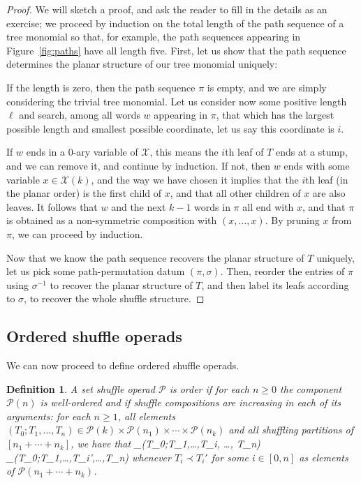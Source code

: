 \documentclass[fleqn, a4paper, twoside]{article}
\makeatletter
\newcommand{\0}{\langle 0\rangle}
\newcommand{\XX}{\mathcal{X}}
\let\[\@undefined
\DeclareRobustCommand{\[}{\begin{equation}}%
\let\]\@undefined
\DeclareRobustCommand{\]}{\end{equation}}%
\theoremstyle{mytheorem}
\theoremstyle{introthm}
\theoremstyle{mydefinition}
\newtheorem{definition}[theorem]{Definition}
\theoremstyle{mydefinition2}
\theoremstyle{plain} %
\newcommand{\?}{\,?\,}
\newcommand{\PP}{{\mathcal{P}}}
\theoremstyle{mytheorem}
\theoremstyle{plain} %
\makeatother
\begin{document}
\begin{proof}
We will sketch a proof, and ask the reader to fill in the
details as an exercise; we proceed by induction on the
total length of the path sequence of a tree monomial so that,
for example, the path sequences appearing in Figure~\ref{fig:paths}
have all length five. First, let us show that the path sequence
determines the planar structure of our tree monomial uniquely:

If the length is zero, then the path sequence $\pi$
is empty, and we are simply considering the trivial tree monomial.
Let us consider now some positive length $\ell$ and search,
among all words $w$ appearing in $\pi$, that which has
the largest possible length and smallest possible coordinate,
let us say this coordinate is $i$.

If $w$ ends in a $0$-ary variable of $\XX$, this means the
$i$th leaf of $T$ ends at a stump, and we can remove it, 
and continue by induction. If not, then $w$ ends with
some variable $x\in \XX(k)$, and the way we have chosen
it implies that the $i$th leaf (in the planar order)
is the first child of $x$, and that all other children
of $x$ are also leaves. It follows that $w$
and the next $k-1$ words in $\pi$ all end with $x$,
and that $\pi$ is obtained as a non-symmetric composition
with $(x,\ldots,x)$. By pruning $x$ from $\pi$, we
can proceed by induction. 

Now that we know the path sequence recovers the planar structure
of $T$ uniquely, let us pick some path-permutation datum
$(\pi,\sigma)$. Then, reorder the entries of $\pi$ using
$\sigma^{-1}$ to recover the planar structure of $T$,
and then label its leafs according to $\sigma$, to 
recover the whole shuffle structure.
\end{proof}


\subsection{Ordered shuffle operads}

We can now proceed to define ordered shuffle operads. 

\begin{definition}
A set shuffle operad $\PP$ is order if for each $n\geqslant 0$
the component $\PP(n)$ is well-ordered and if shuffle compositions
are increasing in each of its arguments: for each $n\geqslant 1$,
all elements $(T_0;T_1,\ldots,T_n) \in\PP(k)\times \PP(n_1)
\times \cdots\times \PP(n_k)$ and all shuffling partitions
of $[n_1+\cdots +n_k]$, we have that
\[ 
\gamma_\pi(T_0;T_1,\ldots,T_i, \ldots, T_n)  \prec
\gamma_\pi(T_0;T_1,\ldots,T_i',\ldots,T_n)
\]
whenever $T_i\prec T_i'$  for some $i\in [0,n]$ as elements
of $\PP(n_1+\cdots+ n_k)$. 
\end{definition}
\end{document}
